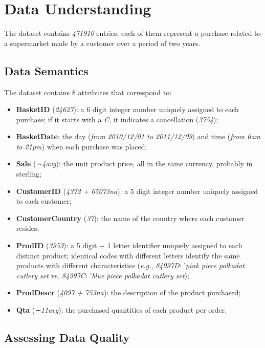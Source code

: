\section{Data Understanding}

The dataset contains \emph{471910} entries, each of them represent a purchase related to a supermarket made by a customer over a period of two years.

\subsection{Data Semantics}

The dataset contains 8 attributes that correspond to:

\begin{itemize}
\item \textbf{BasketID} (\emph{24627}): a 6 digit integer number uniquely assigned to each purchase; if it starts with a \emph{C}, it indicates a cancellation (\emph{3754});
\item \textbf{BasketDate}: the day (\emph{from 2010/12/01 to 2011/12/09}) and time (\emph{from 6am to 21pm}) when each purchase was placed;
\item \textbf{Sale} (\emph{∼4avg}): the unit product price, all in the same currency, probably in sterling;
\item \textbf{CustomerID} (\emph{4372 + 65073na}): a 5 digit integer number uniquely assigned to each customer;
\item \textbf{CustomerCountry} (\emph{37}): the name of the country where each customer resides;
\item \textbf{ProdID} (\emph{3953}): a 5 digit + 1 letter identifier uniquely assigned to each distinct product; identical codes with different letters identify the same products with different characteristics (\emph{e.g.}, \emph{84997D}: '\emph{pink piece polkadot cutlery set} vs. \emph{84997C}: '\emph{blue piece polkadot cutlery set});
\item \textbf{ProdDescr} (\emph{4097 + 753na}): the description of the product purchased;
\item \textbf{Qta} (\emph{∼11avg}): the purchased quantities of each product per order.
\end{itemize}

\subsection{Assessing Data Quality}

